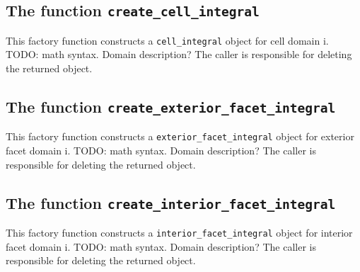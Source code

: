 
\subsection{The function \texttt{create\_cell\_integral}}
This factory function constructs a \texttt{cell\_integral} object for cell domain i.
TODO: math syntax. Domain description?
The caller is responsible for deleting the returned object.



\subsection{The function \texttt{create\_exterior\_facet\_integral}}
This factory function constructs a \texttt{exterior\_facet\_integral} object for exterior facet domain i.
TODO: math syntax. Domain description?
The caller is responsible for deleting the returned object.



\subsection{The function \texttt{create\_interior\_facet\_integral}}
This factory function constructs a \texttt{interior\_facet\_integral} object for interior facet domain i.
TODO: math syntax. Domain description?
The caller is responsible for deleting the returned object.






